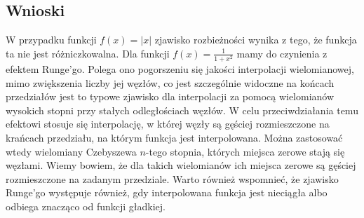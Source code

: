 \documentclass[12pt, a4paper]{article}
\begin{document}
\subsection{Wnioski}
W przypadku funkcji $f(x) = |x|$ zjawisko rozbieżności wynika z tego, że funkcja ta nie jest różniczkowalna.
Dla funkcji $f(x) = \frac{1}{1+x^{2}}$ mamy do czynienia z efektem Runge'go. 
Polega ono pogorszeniu się jakości interpolacji wielomianowej, mimo zwiększenia liczby jej węzłów, co jest szczególnie widoczne na końcach przedziałów jest to typowe zjawisko dla interpolacji za pomocą wielomianów wysokich stopni przy stałych odległościach węzłów. W celu przeciwdziałania temu efektowi stosuje się interpolację, w której węzły są gęściej rozmieszczone na krańcach przedziału, na którym funkcja jest interpolowana. Można zastosować wtedy wielomiany Czebyszewa $n$-tego stopnia, których miejsca zerowe stają się węzłami. Wiemy bowiem, że dla takich wielomianów ich miejsca zerowe są gęściej rozmieszczone na zadanym przedziale. 
Warto również wspomnieć, że zjawisko Runge'go występuje również, gdy interpolowana funkcja jest nieciągła albo odbiega znacząco od funkcji gładkiej.
\end{document}
